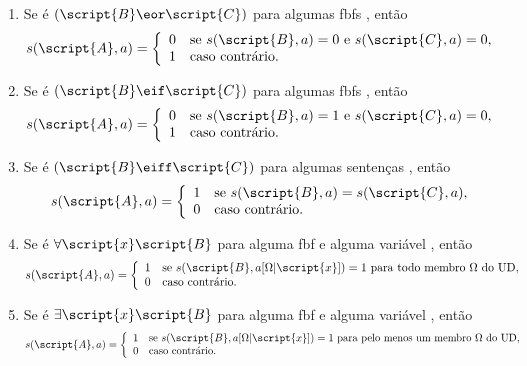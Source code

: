 \begin{enumerate}
\item Se  é $(\script{B}\eor\script{C})$ para algumas fbfs , então
\begin{displaymath}s(\script{A}, a) =
	\left\{\begin{array}{ll}
	0 & \mbox{se $s(\script{B}, a) = 0$  e $s(\script{C}, a) = 0$,}\\
	1 & \mbox{caso contrário.}
	\end{array}\right.
\end{displaymath}

\item Se  é $(\script{B}\eif\script{C})$ para algumas fbfs , então
\begin{displaymath}s(\script{A}, a) =
	\left\{\begin{array}{ll}
	0 & \mbox{se $s(\script{B}, a) = 1$ e $s(\script{C}, a) = 0$,}\\
	1 & \mbox{caso contrário.}
	\end{array}\right.
\end{displaymath}

\item Se  é $(\script{B}\eiff\script{C})$ para algumas sentenças , então
\begin{displaymath}s(\script{A}, a) =
	\left\{\begin{array}{ll}
	1 & \mbox{se $s(\script{B}, a) = s(\script{C}, a)$},\\
	0 & \mbox{caso contrário.}
	\end{array}\right.
\end{displaymath}

\item Se  é $\forall\script{x} \script{B}$ para alguma fbf  e alguma variável , então
\begin{displaymath}s(\script{A}, a) =
	\left\{\begin{array}{ll}
	1 & \mbox{se $s(\script{B}, a[\Omega|\script{x}])=1$ para todo membro $\Omega$ do UD},\\
	0 & \mbox{caso contrário.}
	\end{array}\right.
\end{displaymath}

\item Se  é $\exists\script{x} \script{B}$ para alguma fbf  e alguma variável , então
\begin{displaymath}s(\script{A}, a) =
	\left\{\begin{array}{ll}
	1 & \mbox{se $s(\script{B}, a[\Omega|\script{x}])=1$ para pelo menos um membro $\Omega$ do UD},\\
	0 & \mbox{caso contrário.}
	\end{array}\right.
\end{displaymath}
\end{enumerate}
 
